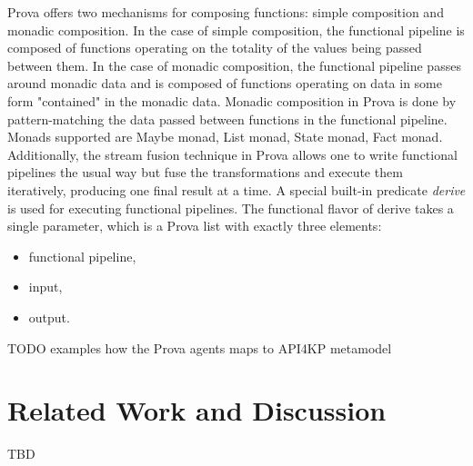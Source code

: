 \documentclass[runningheads]{llncs}
\begin{document}
Prova offers two mechanisms for composing functions: simple composition and monadic composition. In the case of simple composition, the functional pipeline is composed of functions operating on the totality of the values being passed between them. In the case of monadic composition, the functional pipeline passes around monadic data and is composed of functions operating on data in some form "contained" in the monadic data. Monadic composition in Prova is done by pattern-matching the data passed between functions in the functional pipeline.
Monads supported are Maybe monad,  List monad, State monad, Fact monad. Additionally, the stream fusion technique in Prova allows one to write functional pipelines the usual way but fuse the transformations and execute them iteratively, producing one final result at a time. A special built-in predicate \textit{derive} is used for executing functional pipelines. The functional flavor of derive takes a single parameter, which is a Prova list with exactly three elements:
\begin{itemize}
  \item functional pipeline,
  \item input,
  \item output.
\end{itemize}
    
TODO examples how the Prova agents maps to API4KP metamodel


\section{Related Work and Discussion}
TBD


\end{document}
